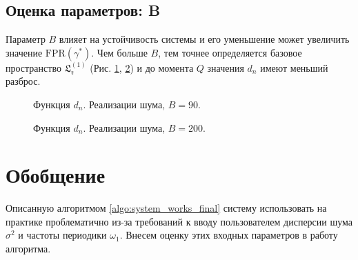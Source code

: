 \documentclass[specialist, substylefile = spbu.rtx,
			   subf, href, 12pt]{disser}
\begin{document}
\newpage
\subsection{Оценка параметров: B}
Параметр $ B $ влияет на устойчивость системы и его уменьшение может увеличить значение $ \mathrm{FPR}(\gamma^*) $. Чем больше $ B $, тем точнее определяется базовое пространство $ \mathfrak{L_r^{(1)}} $ (Рис. \ref{pic:row_diff_small_B}, \ref{pic:row_diff_big_B}) и до момента $ Q $ значения $ d_n $ имеют меньший разброс.
\begin{figure}[!hhh]
	\caption{Функция $ d_n $. Реализации шума, $ B=90 $.}
	\label{pic:row_diff_small_B}
\end{figure}

\begin{figure}[!hhh]
	\caption{Функция $ d_n $. Реализации шума, $ B=200 $.}
	\label{pic:row_diff_big_B}
\end{figure}

\section{Обобщение}\label{sec:generalization}
Описанную алгоритмом \ref{algo:system_works_final} систему использовать на практике проблематично из-за требований к вводу пользователем дисперсии шума $ \sigma^2 $ и частоты периодики $ \omega_1 $. Внесем оценку этих входных параметров в работу алгоритма.
\end{document}
